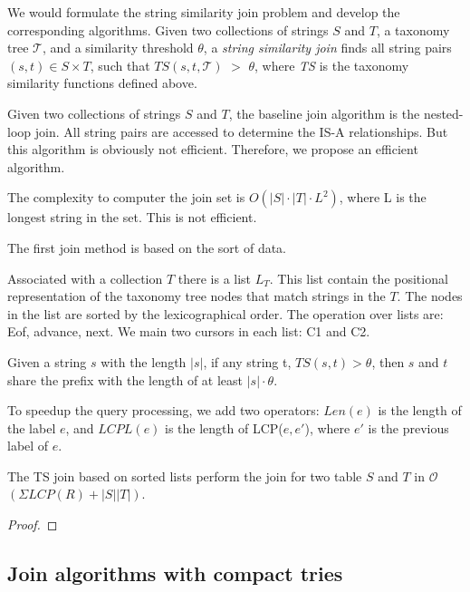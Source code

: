 We would formulate the string similarity join problem and develop the corresponding algorithms. Given two collections of strings $S$ and $T$, a taxonomy tree
$\mathcal{T}$, and a similarity threshold $\theta$, a \textit{string
  similarity join} finds all string pairs $(s, t) \in S \times T$,
such that $TS(s,t,\mathcal{T})$ $>$ $\theta$, where \textit{TS} is
 the taxonomy similarity functions defined above.



Given two collections of strings $S$ and $T$, the baseline join algorithm is the nested-loop join. All string pairs are accessed to determine the IS-A relationships. But this algorithm is obviously not efficient. Therefore, we propose an efficient algorithm.

The complexity to computer the join set is $O(|S| \cdot |T| \cdot L^2)$, where L is the longest string in the set. This is not efficient.



The first join method is based on the sort of data.

Associated with a collection $T$ there is a list $L_T$. This list contain the positional representation of the taxonomy tree nodes that match strings in the $T$. The nodes in the list are sorted by the lexicographical order. The operation over lists are: Eof, advance, next.
We main two cursors in each list: C1 and C2.

\begin{lem} Given a string $s$ with the length $|s|$, if any string t, $TS(s,t) > \theta$,  then $s$ and $t$ share the prefix with the length of at least $|s| \cdot \theta $.
\end{lem}

To speedup the query processing, we add two operators: $Len(e)$ is the length of the label $e$, and $LCPL(e)$ is the length of LCP($e,e'$), where $e'$ is the previous label of $e$. 

\begin{theorem} The TS join based on sorted lists perform the join for two table $S$ and $T$ in $\mathcal{O}$$(\Sigma LCP(R)+|S||T|)$. 
\end{theorem}
\begin{proof}  
\end{proof}

\subsection{Join algorithms with compact tries}

